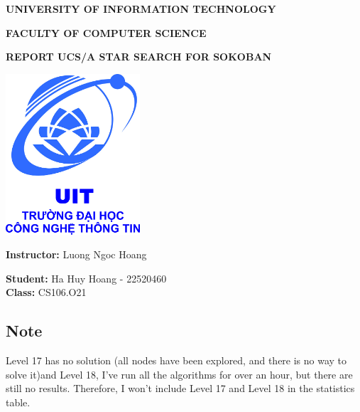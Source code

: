 \documentclass[english, a4paper,12pt]{article}
\date{}
\begin{document}
\begin{titlepage}
\begin{center}
\textbf{UNIVERSITY OF INFORMATION TECHNOLOGY}

\textbf{FACULTY OF COMPUTER SCIENCE}

\vspace{1cm}

\vspace{1cm}

\textbf{REPORT UCS/A STAR SEARCH FOR SOKOBAN}

\vspace{2cm}
\includegraphics[width= 5cm]{logo.png}
\vspace{2cm}

\textbf{Instructor: } Luong Ngoc Hoang

\vspace{0.5cm}

\textbf{Student:} Ha Huy Hoang - 22520460
\vspace{0.5cm}
\\
\textbf{Class:} CS106.O21
\vspace{2cm}
\tableofcontents
\end{center}
\end{titlepage}
\subsection*{Note}
\hspace*{7mm}Level 17 has no solution (all nodes have been explored, and there is no way to solve it)and Level 18, I’ve run all the algorithms for over an hour, but there are still no results. Therefore, I won’t include Level 17 and Level 18 in the statistics table.
\end{document}
